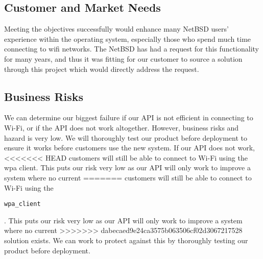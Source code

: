 \subsection{Customer and Market Needs}

Meeting the objectives successfully would enhance many NetBSD users' experience within the operating system, especially those who spend much time connecting to wifi networks. The NetBSD has had a request for this functionality for many years, and thus it was fitting for our customer to source a solution through this project which would directly address the request.

\subsection{Business Risks}

We can determine our biggest failure if our API is not efficient in connecting to Wi-Fi, or if the API does not work altogether. However, business risks 
and hazard is very low. We will thoroughly test our product before deployment to ensure it works before customers use the new system. If our API does not work, 
<<<<<<< HEAD
customers will still be able to connect to Wi-Fi using the wpa client. This puts our risk very low as our API will only work to improve a system where no current 
=======
customers will still be able to connect to Wi-Fi using the \begin{verbatim}wpa_client\end{verbatim}. This puts our risk very low as our API will only work to improve a system where no current 
>>>>>>> dabecaed9e24ca3575b063506cf02d3067217528
solution exists. We can work to protect against this by thoroughly testing our product before deployment. 

